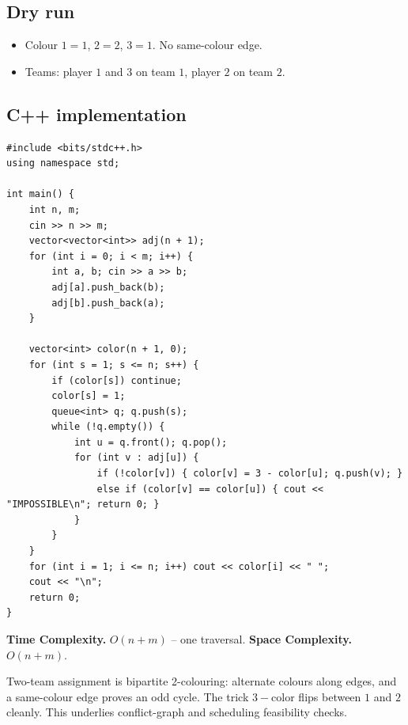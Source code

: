 \subsection*{Dry run}


\begin{itemize}
  \item Colour $1{=}1$, $2{=}2$, $3{=}1$. No same-colour edge.
  \item Teams: player $1$ and $3$ on team $1$, player $2$ on team $2$.
\end{itemize}

\subsection*{C++ implementation}

\begin{lstlisting}
#include <bits/stdc++.h>
using namespace std;

int main() {
    int n, m;
    cin >> n >> m;
    vector<vector<int>> adj(n + 1);
    for (int i = 0; i < m; i++) {
        int a, b; cin >> a >> b;
        adj[a].push_back(b);
        adj[b].push_back(a);
    }

    vector<int> color(n + 1, 0);
    for (int s = 1; s <= n; s++) {
        if (color[s]) continue;
        color[s] = 1;
        queue<int> q; q.push(s);
        while (!q.empty()) {
            int u = q.front(); q.pop();
            for (int v : adj[u]) {
                if (!color[v]) { color[v] = 3 - color[u]; q.push(v); }
                else if (color[v] == color[u]) { cout << "IMPOSSIBLE\n"; return 0; }
            }
        }
    }
    for (int i = 1; i <= n; i++) cout << color[i] << " ";
    cout << "\n";
    return 0;
}
\end{lstlisting}

\begin{complexitybox}
\textbf{Time Complexity.} $O(n+m)$ -- one traversal. \textbf{Space
Complexity.} $O(n+m)$.
\end{complexitybox}

\begin{takeawaybox}
Two-team assignment is bipartite 2-colouring: alternate colours along
edges, and a same-colour edge proves an odd cycle. The trick $3-\text{color}$
flips between $1$ and $2$ cleanly. This underlies conflict-graph and
scheduling feasibility checks.
\end{takeawaybox}
